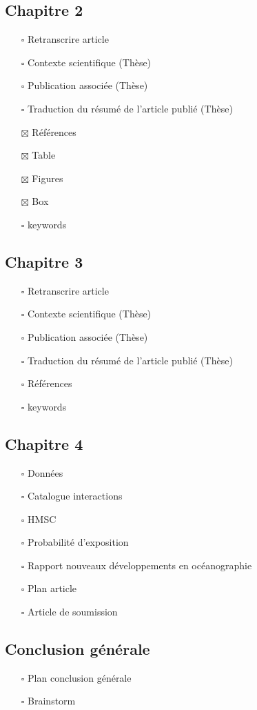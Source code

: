 \hypertarget{chapitre-2}{%
\subsection{Chapitre 2}\label{chapitre-2}}

\begin{itemize}
\tightlist
\item[$\square$]
  Retranscrire article
\item[$\square$]
  Contexte scientifique (Thèse)
\item[$\square$]
  Publication associée (Thèse)
\item[$\square$]
  Traduction du résumé de l'article publié (Thèse)
\item[$\boxtimes$]
  Références
\item[$\boxtimes$]
  Table
\item[$\boxtimes$]
  Figures
\item[$\boxtimes$]
  Box
\item[$\square$]
  keywords
\end{itemize}

\hypertarget{chapitre-3}{%
\subsection{Chapitre 3}\label{chapitre-3}}

\begin{itemize}
\tightlist
\item[$\square$]
  Retranscrire article
\item[$\square$]
  Contexte scientifique (Thèse)
\item[$\square$]
  Publication associée (Thèse)
\item[$\square$]
  Traduction du résumé de l'article publié (Thèse)
\item[$\square$]
  Références
\item[$\square$]
  keywords
\end{itemize}

\hypertarget{chapitre-4}{%
\subsection{Chapitre 4}\label{chapitre-4}}

\begin{itemize}
\tightlist
\item[$\square$]
  Données
\item[$\square$]
  Catalogue interactions
\item[$\square$]
  HMSC
\item[$\square$]
  Probabilité d'exposition
\item[$\square$]
  Rapport nouveaux développements en océanographie
\item[$\square$]
  Plan article
\item[$\square$]
  Article de soumission
\end{itemize}

\hypertarget{conclusion-guxe9nuxe9rale}{%
\subsection{Conclusion générale}\label{conclusion-guxe9nuxe9rale}}

\begin{itemize}
\tightlist
\item[$\square$]
  Plan conclusion générale
\item[$\square$]
  Brainstorm
\end{itemize}
